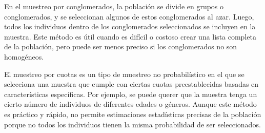 \documentclass[
  letterpaper,
  DIV=11,
  numbers=noendperiod]{scrreprt}
\begin{document}
\begin{tcolorbox}[enhanced jigsaw, arc=.35mm, breakable, coltitle=black, left=2mm, opacityback=0, bottomtitle=1mm, colbacktitle=quarto-callout-note-color!10!white, title=\textcolor{quarto-callout-note-color}{\faInfo}\hspace{0.5em}{Muestreo por Conglomerados}, titlerule=0mm, colback=white, colframe=quarto-callout-note-color-frame, bottomrule=.15mm, rightrule=.15mm, opacitybacktitle=0.6, toptitle=1mm, toprule=.15mm, leftrule=.75mm]

En el muestreo por conglomerados, la población se divide en grupos o
conglomerados, y se seleccionan algunos de estos conglomerados al azar.
Luego, todos los individuos dentro de los conglomerados seleccionados se
incluyen en la muestra. Este método es útil cuando es difícil o costoso
crear una lista completa de la población, pero puede ser menos preciso
si los conglomerados no son homogéneos.

\end{tcolorbox}

\begin{tcolorbox}[enhanced jigsaw, arc=.35mm, breakable, coltitle=black, left=2mm, opacityback=0, bottomtitle=1mm, colbacktitle=quarto-callout-note-color!10!white, title=\textcolor{quarto-callout-note-color}{\faInfo}\hspace{0.5em}{Muestreo por Cuotas}, titlerule=0mm, colback=white, colframe=quarto-callout-note-color-frame, bottomrule=.15mm, rightrule=.15mm, opacitybacktitle=0.6, toptitle=1mm, toprule=.15mm, leftrule=.75mm]

El muestreo por cuotas es un tipo de muestreo no probabilístico en el
que se selecciona una muestra que cumple con ciertas cuotas
preestablecidas basadas en características específicas. Por ejemplo, se
puede querer que la muestra tenga un cierto número de individuos de
diferentes edades o géneros. Aunque este método es práctico y rápido, no
permite estimaciones estadísticas precisas de la población porque no
todos los individuos tienen la misma probabilidad de ser seleccionados.

\end{tcolorbox}
\end{document}
